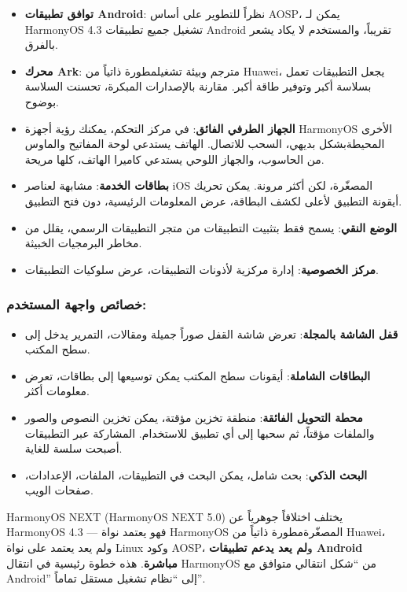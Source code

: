 \begin{itemize}
  \item \textbf{توافق تطبيقات Android}: نظراً للتطوير على أساس AOSP، يمكن لـ HarmonyOS 4.3 تشغيل جميع تطبيقات Android تقريباً، والمستخدم لا يكاد يشعر بالفرق.
  \item \textbf{محرك Ark}: مترجم وبيئة تشغيلمطورة ذاتياً من Huawei، يجعل التطبيقات تعمل بسلاسة أكبر وتوفير طاقة أكبر. مقارنة بالإصدارات المبكرة، تحسنت السلاسة بوضوح.
  \item \textbf{الجهاز الطرفي الفائق}: في مركز التحكم، يمكنك رؤية أجهزة HarmonyOS الأخرى المحيطةبشكل بديهي، السحب للاتصال. الهاتف يستدعي لوحة المفاتيح والماوس من الحاسوب، والجهاز اللوحي يستدعي كاميرا الهاتف، كلها مريحة.
  \item \textbf{بطاقات الخدمة}: مشابهة لعناصر iOS المصغّرة، لكن أكثر مرونة. يمكن تحريك أيقونة التطبيق لأعلى لكشف البطاقة، عرض المعلومات الرئيسية، دون فتح التطبيق.
  \item \textbf{الوضع النقي}: يسمح فقط بتثبيت التطبيقات من متجر التطبيقات الرسمي، يقلل من مخاطر البرمجيات الخبيثة.
  \item \textbf{مركز الخصوصية}: إدارة مركزية لأذونات التطبيقات، عرض سلوكيات التطبيقات.
\end{itemize}

\subsubsection*{خصائص واجهة المستخدم:}

\begin{itemize}
  \item \textbf{قفل الشاشة بالمجلة}: تعرض شاشة القفل صوراً جميلة ومقالات، التمرير يدخل إلى سطح المكتب.
  \item \textbf{البطاقات الشاملة}: أيقونات سطح المكتب يمكن توسيعها إلى بطاقات، تعرض معلومات أكثر.
  \item \textbf{محطة التحويل الفائقة}: منطقة تخزين مؤقتة، يمكن تخزين النصوص والصور والملفات مؤقتاً، ثم سحبها إلى أي تطبيق للاستخدام. المشاركة عبر التطبيقات أصبحت سلسة للغاية.
  \item \textbf{البحث الذكي}: بحث شامل، يمكن البحث في التطبيقات، الملفات، الإعدادات، صفحات الويب.
\end{itemize}


HarmonyOS NEXT (HarmonyOS NEXT 5.0) يختلف اختلافاً جوهرياً عن HarmonyOS 4.3 — فهو يعتمد نواة HarmonyOS المصغّرةمطورة ذاتياً من Huawei، ولم يعد يعتمد على نواة Linux وكود AOSP، و\textbf{لم يعد يدعم تطبيقات Android مباشرة}. هذه خطوة رئيسية في انتقال HarmonyOS من “شكل انتقالي متوافق مع Android” إلى “نظام تشغيل مستقل تماماً”.

